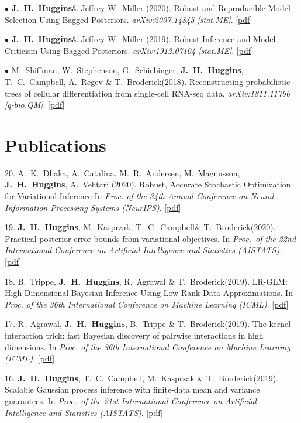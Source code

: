 \documentclass[margin,line]{res}
\newcommand{\me}{\textbf{J.~H.~Huggins}\xspace}
\newcommand{\trevor}{T.~C.~Campbell\xspace}
\newcommand{\tamara}{T.~Broderick\xspace}
\newcommand{\paperref}[1]{[\href{#1}{pdf}]}
\newcommand{\paperref}[1]{}
\begin{document}
\begin{resume}
$\bullet$ \me \& Jeffrey W.~Miller (2020).
Robust and Reproducible Model Selection Using Bagged Posteriors.
\emph{arXiv:2007.14845 [stat.ME]}.
\paperref{https://arxiv.org/abs/2007.14845}

$\bullet$ \me \& Jeffrey W.~Miller (2019).
Robust Inference and Model Criticism Using Bagged Posteriors.
\emph{arXiv:1912.07104 [stat.ME]}.
\paperref{https://arxiv.org/abs/1912.07104}

$\bullet$ M.~Shiffman, W.~Stephenson, G.~Schiebinger,  \me,  \trevor, A.~Regev \& \tamara  (2018).
Reconstructing probabilistic trees of cellular differentiation from single-cell RNA-seq data.
\emph{arXiv:1811.11790 [q-bio.QM]}.
\paperref{https://arxiv.org/abs/1811.1179}



\section{\sc Publications}

20. A.~K.~Dhaka, A.~Catalina, M.~R.~Andersen, M.~Magnusson, \me, A.~Vehtari (2020).
Robust, Accurate Stochastic Optimization for Variational Inference
In \emph{Proc. of the 34th Annual Conference on Neural Information Processing Systems (NeurIPS)}.
\paperref{https://arxiv.org/abs/2009.00666}

19. \me, M.~Kasprzak, \trevor \& \tamara (2020).
Practical posterior error bounds from variational objectives.
In \emph{Proc.~of the 22nd International Conference on Artificial Intelligence and Statistics (AISTATS)}.
\paperref{https://arxiv.org/abs/1910.04102}

18. B.~Trippe, \me, R.~Agrawal \& \tamara (2019).
LR-GLM: High-Dimensional Bayesian Inference Using Low-Rank Data Approximations.
In \emph{Proc. of the 36th International Conference on Machine Learning (ICML)}.
\paperref{https://arxiv.org/abs/1905.07499}

17.  R.~Agrawal, \me, B.~Trippe \& \tamara (2019).
The kernel interaction trick: fast Bayesian discovery of pairwise interactions in high dimensions.
In \emph{Proc. of the 36th International Conference on Machine Learning (ICML)}.
\paperref{https://arxiv.org/pdf/1905.06501}

16. \me, \trevor, M.~Kasprzak \& \tamara (2019).
Scalable Gaussian process inference with finite-data mean and variance guarantees.
In \emph{Proc.~of the 21st International Conference on Artificial Intelligence and Statistics (AISTATS)}.
\paperref{https://arxiv.org/abs/1806.10234}


\end{resume}
\end{document}
